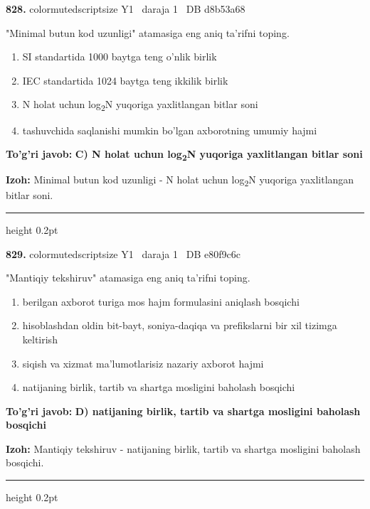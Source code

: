 \documentclass[10pt,a4paper,oneside]{article}
\begin{document}
\noindent\textbf{\color{ink}828.}  {color{muted}scriptsize Y1 \textbullet\ daraja 1 \textbullet\ DB d8b53a68}
\par
"Minimal butun kod uzunligi" atamasiga eng aniq ta'rifni toping.
\begin{enumerate}[label=\Alph*),leftmargin=9mm]
\item SI standartida 1000 baytga teng o'nlik birlik
\item IEC standartida 1024 baytga teng ikkilik birlik
\item N holat uchun log\textsubscript{2}N yuqoriga yaxlitlangan bitlar soni
\item tashuvchida saqlanishi mumkin bo'lgan axborotning umumiy hajmi
\end{enumerate}
\begin{tcolorbox}[enhanced,breakable,colback=teal!4,colframe=teal!50!black,boxrule=0.5pt,arc=1.1mm,left=3mm,right=3mm,top=1.7mm,bottom=1.7mm,before skip=2mm,after skip=2mm]
\textbf{\color{teal}To'g'ri javob:} \textbf{C) N holat uchun log\textsubscript{2}N yuqoriga yaxlitlangan bitlar soni}
\par\smallskip
\textbf{Izoh:} Minimal butun kod uzunligi - N holat uchun log\textsubscript{2}N yuqoriga yaxlitlangan bitlar soni.
\end{tcolorbox}
\vspace{2mm}\hrule height 0.2pt \vspace{3mm}

\noindent\textbf{\color{ink}829.}  {color{muted}scriptsize Y1 \textbullet\ daraja 1 \textbullet\ DB e80f9c6c}
\par
"Mantiqiy tekshiruv" atamasiga eng aniq ta'rifni toping.
\begin{enumerate}[label=\Alph*),leftmargin=9mm]
\item berilgan axborot turiga mos hajm formulasini aniqlash bosqichi
\item hisoblashdan oldin bit-bayt, soniya-daqiqa va prefikslarni bir xil tizimga keltirish
\item siqish va xizmat ma'lumotlarisiz nazariy axborot hajmi
\item natijaning birlik, tartib va shartga mosligini baholash bosqichi
\end{enumerate}
\begin{tcolorbox}[enhanced,breakable,colback=teal!4,colframe=teal!50!black,boxrule=0.5pt,arc=1.1mm,left=3mm,right=3mm,top=1.7mm,bottom=1.7mm,before skip=2mm,after skip=2mm]
\textbf{\color{teal}To'g'ri javob:} \textbf{D) natijaning birlik, tartib va shartga mosligini baholash bosqichi}
\par\smallskip
\textbf{Izoh:} Mantiqiy tekshiruv - natijaning birlik, tartib va shartga mosligini baholash bosqichi.
\end{tcolorbox}
\vspace{2mm}\hrule height 0.2pt \vspace{3mm}
\end{document}

